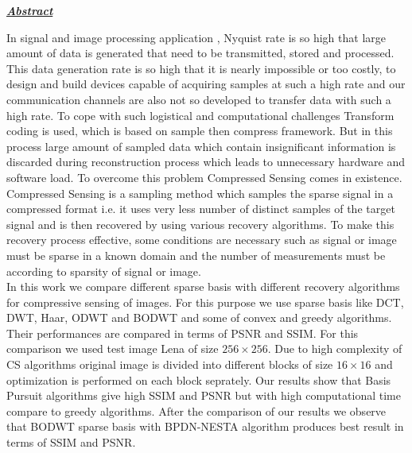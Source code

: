 \begin{center}
\textbf{\textit{{\color{blue}\large{\underline{Abstract}}}}}
\end{center}


\hspace{1.5cm}In signal and image processing application , Nyquist rate is so high that large amount of data is
generated that need to be transmitted, stored and processed. This data generation rate is so high that it is nearly impossible or too costly, to design and build
devices capable of acquiring samples at such a high rate and our communication channels are
also not so developed to transfer data with such a high rate. To cope with such logistical and computational challenges Transform coding is used, which is based on sample then compress framework. But in this process large amount of sampled data  which contain insignificant information is discarded during reconstruction process which leads to unnecessary hardware and software load. To overcome this problem Compressed Sensing comes in existence.\\
         Compressed Sensing is a sampling method which samples the sparse  signal in a compressed format i.e. it uses very less
number of distinct samples of the target signal and is then recovered by using various recovery
algorithms. To make this recovery process effective, some conditions are necessary such as signal or image must be sparse in a known domain and the number of measurements must be according to sparsity of signal or image. \\
In this work we compare different sparse basis with different recovery algorithms for compressive sensing of images. For this purpose we use sparse basis like DCT, DWT, Haar, ODWT and BODWT and some of convex and greedy algorithms. Their performances are compared in terms of PSNR and SSIM. For this comparison we used test image Lena of size $256\times 256$. Due to high complexity of CS algorithms original image is divided into different blocks of size $16\times 16$ and optimization is performed on each block seprately. Our results show that Basis Pursuit algorithms give high SSIM and PSNR but with high computational time compare to greedy algorithms. After the comparison of our results we observe that BODWT sparse basis with BPDN-NESTA algorithm produces best result in terms of SSIM and PSNR.
